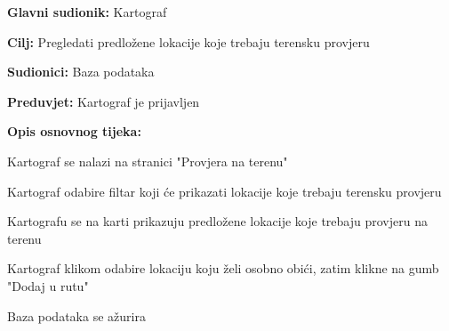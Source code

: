 					\noindent {}
					\begin{packed_item}
	
						\item \textbf{Glavni sudionik: }Kartograf
						\item  \textbf{Cilj:} Pregledati predložene lokacije koje trebaju terensku provjeru
						\item  \textbf{Sudionici:} Baza podataka
						\item  \textbf{Preduvjet:} Kartograf je prijavljen
						\item  \textbf{Opis osnovnog tijeka:}
						
						\item[] \begin{packed_enum}
	
							\item Kartograf se nalazi na stranici "Provjera na terenu"
							\item Kartograf odabire filtar koji će prikazati lokacije koje trebaju terensku provjeru
							\item Kartografu se na karti prikazuju predložene lokacije koje trebaju provjeru na terenu
							\item Kartograf klikom odabire lokaciju koju želi osobno obići, zatim klikne na gumb "Dodaj u rutu"
							\item Baza podataka se ažurira

						\end{packed_enum}
						
					\end{packed_item}
					
